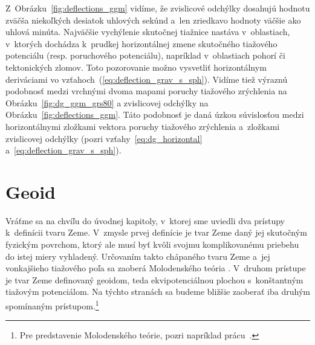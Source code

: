 \documentclass[a4paper,12pt]{book}
\begin{document}
Z~Obrázku~\ref{fig:deflections_ggm} vidíme, že zvislicové odchýlky dosahujú 
hodnotu zväčša niekoľkých desiatok uhlových sekúnd a~len zriedkavo hodnoty 
väčšie ako uhlová minúta.  Najväčšie vychýlenie skutočnej tiažnice nastáva 
v~oblastiach, v~ktorých dochádza k~prudkej horizontálnej zmene skutočného 
tiažového potenciálu (resp. poruchového potenciálu), napríklad v~oblastiach 
pohorí či tektonických zlomov.  Toto pozorovanie možno vysvetliť horizontálnym 
deriváciami vo vzťahoch~(\ref{eq:deflection_grav_s_sph}).  Vidíme tiež výraznú 
podobnosť medzi vrchnými dvoma mapami poruchy tiažového zrýchlenia na 
Obrázku~\ref{fig:dg_ggm_grs80} a zvislicovej odchýlky na 
Obrázku~\ref{fig:deflections_ggm}.  Táto podobnosť je daná úzkou súvislosťou 
medzi horizontálnymi zložkami vektora poruchy tiažového zrýchlenia a~zložkami 
zvislicovej odchýlky (pozri vzťahy~\ref{eq:dg_horizontal} 
a~\ref{eq:deflection_grav_s_sph}).







\chapter{Geoid}
\label{sec:geoid}

Vráťme sa na chvíľu do úvodnej kapitoly, v~ktorej sme uviedli dva prístupy 
k~definícii tvaru Zeme.  V~zmysle prvej definície je tvar Zeme daný jej 
skutočným fyzickým povrchom, ktorý ale musí byť kvôli svojmu komplikovanému 
priebehu do istej miery vyhladený.  Určovaním takto chápaného tvaru Zeme a~jej 
vonkajšieho tiažového poľa sa zaoberá Molodenského teória 
\parencite{Molodensky1962,Borre2006,MoritzAdvancedGeodesy,MoritzPhysicalGeodesy}.  
V~druhom prístupe je tvar Zeme definovaný geoidom, teda ekvipotenciálnou 
plochou s~konštantným tiažovým potenciálom.  Na týchto stranách sa budeme 
bližšie zaoberať iba druhým spomínaným prístupom.\footnote{Pre predstavenie 
Molodenského teórie, pozri napríklad prácu~\textcite{Janak2006}.}
\end{document}

